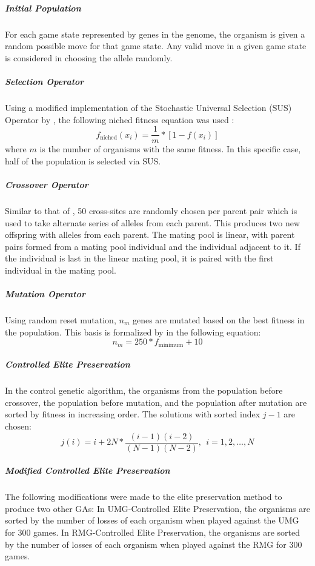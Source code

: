 \documentclass{strrespaper-trad}
\begin{document}
					\subparagraph{Initial Population}
						For each game state represented by genes in the genome, the organism is given a random possible move for that game state.
						Any valid move in a given game state is considered in choosing the allele randomly.
					\subparagraph{Selection Operator}
						Using a modified implementation of the Stochastic Universal Selection (SUS) Operator by \textcite{panchapakesanStochasticUniversalSampling2014}, the following niched fitness equation was used \autocite{bhattSearchNolossStrategies2008}:
						\begin{equation*}
							f_\mathrm{niched}(x_i) = \frac{1}{m} * [1 - f(x_i)]
						\end{equation*}
						where $m$ is the number of organisms with the same fitness.
						In this specific case, half of the population is selected via SUS.
					\subparagraph{Crossover Operator}
						Similar to that of \textcite{bhattSearchNolossStrategies2008}, 50 cross-sites are randomly chosen per parent pair which is used to take alternate series of alleles from each parent.
						This produces two new offspring with alleles from each parent.
						The mating pool is linear, with parent pairs formed from a mating pool individual and the individual adjacent to it.
						If the individual is last in the linear mating pool, it is paired with the first individual in the mating pool.
					\subparagraph{Mutation Operator}
						Using random reset mutation, $n_m$ genes are mutated based on the best fitness in the population.
						This basis is formalized by \textcite{bhattSearchNolossStrategies2008} in the following equation:
						\begin{equation*}
							n_m = 250 * f_\mathrm{minimum} + 10
						\end{equation*}
					\subparagraph{Controlled Elite Preservation}
						In the control genetic algorithm, the organisms from the population before crossover, the population before mutation, and the population after mutation are sorted by fitness in increasing order.
						The solutions with sorted index $j - 1$ are chosen:
						\begin{equation*}
							j(i) = i + 2N * \frac{(i - 1)(i - 2)}{(N - 1)(N - 2)},~~i = 1, 2, \dots, N
						\end{equation*}
					\subparagraph{Modified Controlled Elite Preservation}
						The following modifications were made to the elite preservation method to produce two other GAs:
						In UMG-Controlled Elite Preservation, the organisms are sorted by the number of losses of each organism when played against the UMG for 300 games.
						In RMG-Controlled Elite Preservation, the organisms are sorted by the number of losses of each organism when played against the RMG for 300 games.
\end{document}
